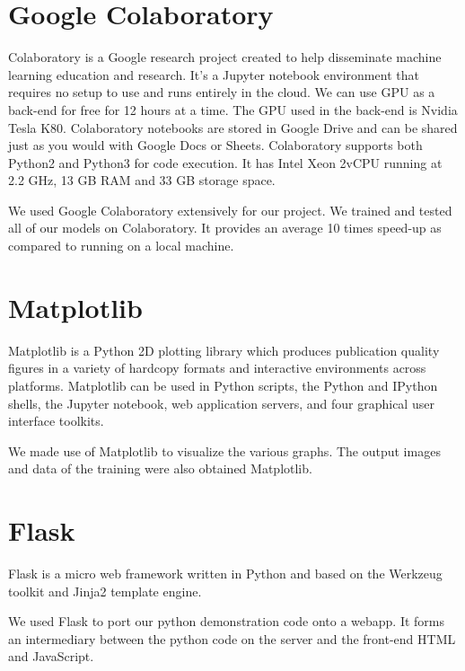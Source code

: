 \section{Google Colaboratory} %
\label{sec:google_colaboratory}
Colaboratory is a Google research project created to help disseminate machine learning education and research. It’s a Jupyter notebook environment that requires no setup to use and runs entirely in the cloud. We can use GPU as a back-end for free for 12 hours at a time. The GPU used in the back-end is Nvidia Tesla K80. Colaboratory notebooks are stored in Google Drive and can be shared just as you would with Google Docs or Sheets. Colaboratory supports both Python2 and Python3 for code execution. It has Intel Xeon 2vCPU running at 2.2 GHz, 13 GB RAM and 33 GB storage space.
\par\bigskip
We used Google Colaboratory extensively for our project. We trained and tested all of our models on Colaboratory. It provides an average 10 times speed-up as compared to running on a local machine. 

\section{Matplotlib} %
\label{sec:matplotlib}
Matplotlib is a Python 2D plotting library which produces publication quality figures in a variety of hardcopy formats and interactive environments across platforms. Matplotlib can be used in Python scripts, the Python and IPython shells, the Jupyter notebook, web application servers, and four graphical user interface toolkits.
\par\bigskip
We made use of Matplotlib to visualize the various graphs. The output images and data of the training were also obtained Matplotlib.

\section{Flask} %
\label{sec:flask}
Flask is a micro web framework written in Python and based on the Werkzeug toolkit and Jinja2 template engine. 
\par\bigskip
We used Flask to port our python demonstration code onto a webapp. It forms an intermediary between the python code on the server and the front-end HTML and JavaScript.

